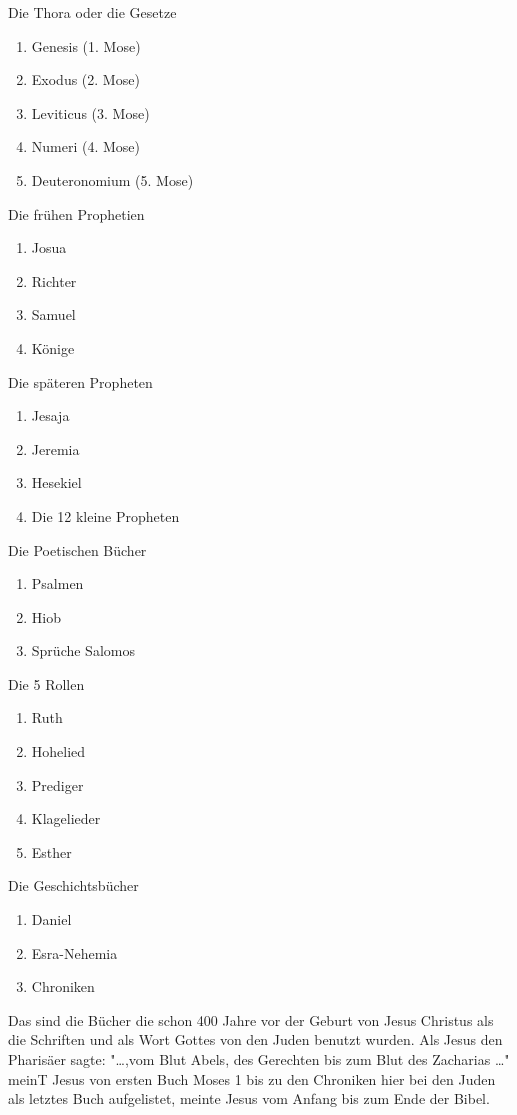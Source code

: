 Die Thora oder die Gesetze
\begin{enumerate}
  \item Genesis (1. Mose)
  \item Exodus (2. Mose)
  \item Leviticus (3. Mose)
  \item Numeri (4. Mose)
  \item Deuteronomium (5. Mose)
\end{enumerate}
Die frühen Prophetien
\begin{enumerate}
  \item Josua
  \item Richter
  \item Samuel
  \item Könige
\end{enumerate}
Die späteren Propheten
\begin{enumerate}
  \item Jesaja
  \item Jeremia
  \item Hesekiel
  \item Die 12 kleine Propheten
\end{enumerate}
Die Poetischen Bücher
\begin{enumerate}
  \item Psalmen
  \item Hiob
  \item Sprüche Salomos
\end{enumerate}
Die 5 Rollen
\begin{enumerate}
  \item Ruth
  \item Hohelied
  \item Prediger
  \item Klagelieder
  \item Esther
\end{enumerate}
Die Geschichtsbücher
\begin{enumerate}
  \item Daniel
  \item Esra-Nehemia
  \item Chroniken
\end{enumerate}
Das sind die Bücher die schon 400 Jahre vor der Geburt von Jesus Christus als die Schriften und als Wort Gottes von den Juden benutzt wurden. Als Jesus den Pharisäer sagte: "\dots ,vom Blut Abels, des Gerechten bis zum Blut des Zacharias \dots" meinT Jesus von ersten Buch Moses 1 bis zu den Chroniken hier bei den Juden als letztes Buch aufgelistet, meinte Jesus vom Anfang bis zum Ende der Bibel.

